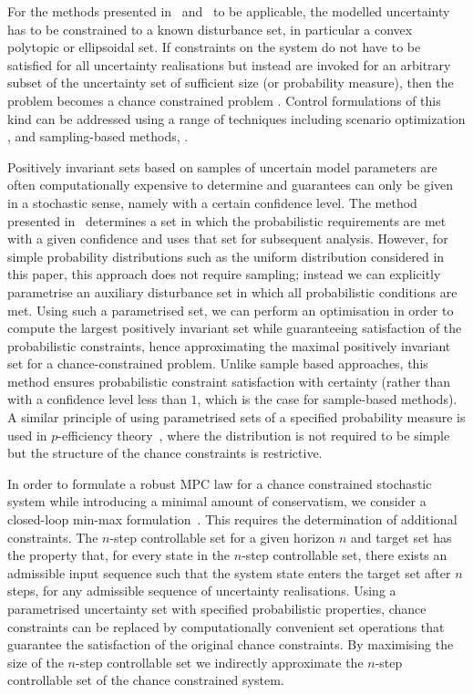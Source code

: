 \documentclass{ifacconf}
\begin{document}
For the methods presented in~\cite{Kolmanovsky:1998} and~\cite{blanchini:2007} to be applicable, the modelled uncertainty has to be constrained to a known disturbance set, in particular a convex polytopic or ellipsoidal set.
%
If constraints on the system do not have to be satisfied for all uncertainty realisations but instead are invoked for an arbitrary subset of the uncertainty set of sufficient size (or probability measure), then the problem becomes a chance constrained problem \cite[see e.g.][]{Kall1994}.
%
Control formulations of this kind can be addressed using a range of techniques including scenario optimization \citep[e.g.][]{Calafiore2010}, and sampling-based methods, \citep[e.g.][]{Margellos2014,Zhang2015,Fleming2016}.
%

Positively invariant sets based on samples of uncertain model parameters are often computationally expensive to determine and guarantees can only be given in a stochastic sense, namely with a certain confidence level.
%
The method presented in~\cite{Zhang2015} determines a set in which the probabilistic requirements are met with a given confidence and uses that set for subsequent analysis.
%
However, for simple probability distributions such as the uniform distribution considered in this paper, this approach does not require sampling; instead we can explicitly parametrise an auxiliary disturbance set in which all probabilistic conditions are met.
%
Using such a parametrised set, we can perform an optimisation
in order to compute the largest positively invariant set while guaranteeing satisfaction of the probabilistic constraints, hence approximating the maximal positively invariant set for a chance-constrained problem.
%
Unlike sample based approaches, this method ensures probabilistic constraint satisfaction with certainty (rather than with a confidence level less than $1$, which is the case for sample-based methods).
%
A similar principle of using parametrised sets of a specified probability measure is used in $p$-efficiency theory~\citep{Dentcheva2009}, where the distribution is not required to be simple but the structure of the chance constraints is restrictive.

In order to formulate a robust MPC law for a chance constrained stochastic system while introducing a minimal amount of conservatism, we consider a closed-loop min-max formulation~\citep{Lee:1997}. This requires the determination of additional constraints.
%
The $n$-step controllable set for a given horizon $n$ and target set \citep[see e.g.][]{bertsekas71} has the property that, for every state in the $n$-step controllable set, there exists an admissible input sequence such that the system state enters the target set after $n$ steps, for any admissible sequence of uncertainty realisations.
%
Using a parametrised uncertainty set with specified probabilistic properties, chance constraints can be replaced by computationally convenient set operations that guarantee the satisfaction of the original chance constraints.
%
By maximising the size of the $n$-step controllable set we indirectly approximate the $n$-step controllable set of the chance constrained system.
\end{document}

